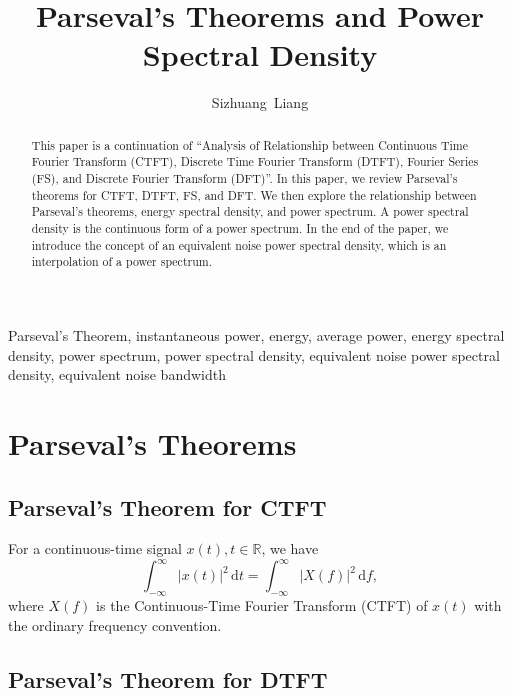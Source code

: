 \documentclass[journal,twoside]{IEEEtran}
\newcommand{\dd}{\,\mathrm{d}}
\begin{document}
\title{Parseval's Theorems and Power Spectral Density}

\author{Sizhuang~Liang}

\maketitle

\begin{abstract}

This paper is a continuation of ``Analysis of Relationship between Continuous Time Fourier Transform (CTFT), Discrete Time Fourier
Transform (DTFT), Fourier Series (FS), and Discrete Fourier Transform (DFT)''. In this paper, we review Parseval's theorems for CTFT, DTFT, FS, and DFT. We then explore the relationship between Parseval's theorems, energy spectral density, and power spectrum. A power spectral density is the continuous form of a power spectrum. In the end of the paper, we introduce the concept of an equivalent noise power spectral density, which is an interpolation of a power spectrum.

\end{abstract}

\begin{IEEEkeywords}
Parseval's Theorem, instantaneous power, energy, average power, energy spectral density, power spectrum, power spectral density, equivalent noise power spectral density, equivalent noise bandwidth
\end{IEEEkeywords}

\section{Parseval's Theorems}

\subsection{Parseval's Theorem for CTFT}

For a continuous-time signal $x(t), t\in\mathbb{R}$, we have
\begin{equation}
\int_{-\infty}^{\infty}|x(t)|^2\dd t = \int_{-\infty}^{\infty}|X(f)|^2\dd f,\label{eqn:parseval_CTFT}
\end{equation}
where $X(f)$ is the Continuous-Time Fourier Transform (CTFT) of $x(t)$ with the ordinary frequency convention.

\subsection{Parseval's Theorem for DTFT}
\end{document}
